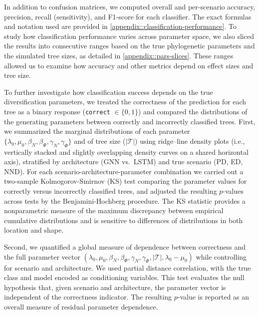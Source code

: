 {In addition to confusion matrices, we computed overall and per-scenario accuracy, precision, recall (sensitivity), and F1-score for each classifier. The exact formulas and notation used are provided in \autoref{appendix::classification-performance}. To study how classification performance varies across parameter space, we also sliced the results into consecutive ranges based on the true phylogenetic parameters and the simulated tree sizes, as detailed in \autoref{appendix::pars-slices}. These ranges allowed us to examine how accuracy and other metrics depend on effect sizes and tree size.

To further investigate how classification success depends on the true diversification parameters, we treated the correctness of the prediction for each tree as a binary response (\texttt{correct} \(\in \{0,1\}\)) and compared the distributions of the generating parameters between correctly and incorrectly classified trees. First, we summarized the marginal distributions of each parameter $\{\lambda_0, \mu_0, \beta_N, \beta_{\varPhi}, \gamma_N, \gamma_{\varPhi}\}$ and of tree size ($|\mathcal{T}|$) using ridge--line density plots (i.e., vertically stacked and slightly overlapping density curves on a shared horizontal axis), stratified by architecture (GNN vs.\ LSTM) and true scenario (PD, ED, NND). For each scenario-architecture-parameter combination we carried out a two-sample Kolmogorov-Smirnov (KS) test comparing the parameter values for correctly versus incorrectly classified trees, and adjusted the resulting $p$-values across tests by the Benjamini-Hochberg procedure. The KS statistic provides a nonparametric measure of the maximum discrepancy between empirical cumulative distributions and is sensitive to differences of distributions in both location and shape.

Second, we quantified a global measure of dependence between correctness and the full parameter vector $(\lambda_0,\mu_0,\beta_N,\beta_{\varPhi},\gamma_N,\gamma_{\varPhi}, |\mathcal{T}|, \lambda_0-\mu_0)$ while controlling for scenario and architecture. We used partial distance correlation, with the true class and model encoded as conditioning variables. This test evaluates the null hypothesis that, given scenario and architecture, the parameter vector is independent of the correctness indicator. The resulting \(p\)-value is reported as an overall measure of residual parameter dependence.

}
